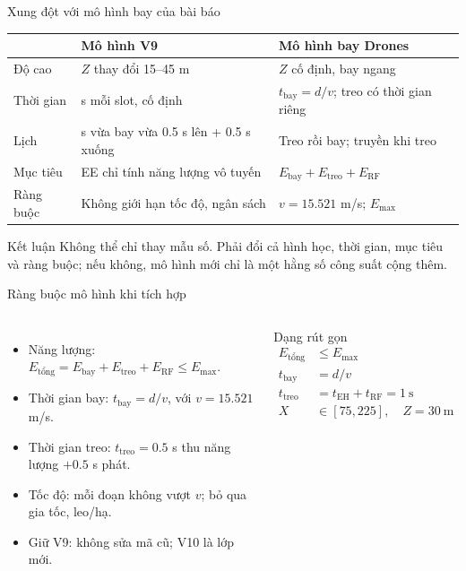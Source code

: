 \documentclass[t,aspectratio=169]{beamer}
\begin{document}
\begin{frame}{Xung đột với mô hình bay của bài báo}
  \centering\small
  \setlength{\tabcolsep}{5pt}
  \renewcommand{\arraystretch}{1.25}
  \begin{tabular}{@{}>{\raggedright\arraybackslash}p{2.3cm} >{\raggedright\arraybackslash}p{5.0cm} >{\raggedright\arraybackslash}p{5.7cm}@{}}
    \toprule
    & \textbf{Mô hình V9} & \textbf{Mô hình bay Drones}\\
    \midrule
    Độ cao & $Z$ thay đổi 15--45 m & $Z$ cố định, bay ngang\\
    Thời gian & 1 s mỗi slot, cố định & $t_{\mathrm{bay}}=d/v$; treo có thời gian riêng\\
    Lịch & 1 s vừa bay vừa 0.5 s lên + 0.5 s xuống & Treo rồi bay; truyền khi treo\\
    Mục tiêu & EE chỉ tính năng lượng vô tuyến & $E_{\mathrm{bay}}+E_{\mathrm{treo}}+E_{\mathrm{RF}}$\\
    Ràng buộc & Không giới hạn tốc độ, ngân sách & $v=15.521$ m/s; $E_{\max}$\\
    \bottomrule
  \end{tabular}
  \vspace{6pt}
  \begin{alertblock}{Kết luận}\small
  Không thể chỉ thay mẫu số. Phải đổi cả hình học, thời gian, mục tiêu và ràng buộc; nếu không, mô hình mới chỉ là một hằng số công suất cộng thêm.
  \end{alertblock}
\end{frame}

\begin{frame}{Ràng buộc mô hình khi tích hợp}
  \begin{columns}[T]
  \small
  \begin{itemize}\setlength{\itemsep}{4pt}
    \item Năng lượng: \(E_{\text{tổng}}=E_{\text{bay}}+E_{\text{treo}}+E_{\text{RF}}\le E_{\max}\).
    \item Thời gian bay: \(t_{\text{bay}}=d/v\), với \(v=15.521\) m/s.
    \item Thời gian treo: \(t_{\text{treo}}=0.5\) s thu năng lượng \(+0.5\) s phát.
    \item Tốc độ: mỗi đoạn không vượt \(v\); bỏ qua gia tốc, leo/hạ.
    \item Giữ V9: không sửa mã cũ; V10 là lớp mới.
  \end{itemize}
  \begin{block}{Dạng rút gọn}\scriptsize
  \[
  \begin{aligned}
  E_{\text{tổng}}&\le E_{\max}\\
  t_{\text{bay}}&=d/v\\
  t_{\text{treo}}&=t_{\text{EH}}+t_{\text{RF}}=1\ \text{s}\\
  X&\in[75,225],\quad Z=30\ \text{m}
  \end{aligned}
  \]
  \end{block}
  \end{columns}
\end{frame}
\end{document}
